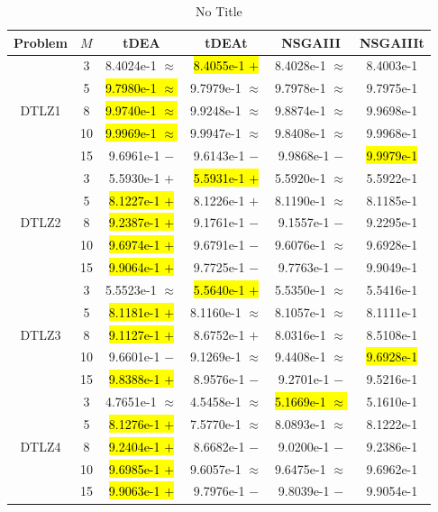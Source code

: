 \documentclass[conference]{IEEEtran}
\begin{document}
\begin{table}[htbp]
  \renewcommand{\arraystretch}{1}
  \centering
  \caption{No Title}
  \begin{tabular}{cccccc}
  \toprule
  Problem&$M$&tDEA&tDEAt&NSGAIII&NSGAIIIt\\
  \midrule
  \multirow{5}{*}{DTLZ1}&3&8.4024e-1 $\approx$&\hl{8.4055e-1 $+$}&8.4028e-1 $\approx$&8.4003e-1\\
  &5&\hl{9.7980e-1 $\approx$}&9.7979e-1 $\approx$&9.7978e-1 $\approx$&9.7975e-1\\
  &8&\hl{9.9740e-1 $\approx$}&9.9248e-1 $\approx$&9.8874e-1 $\approx$&9.9698e-1\\
  &10&\hl{9.9969e-1 $\approx$}&9.9947e-1 $\approx$&9.8408e-1 $\approx$&9.9968e-1\\
  &15&9.6961e-1 $-$&9.6143e-1 $-$&9.9868e-1 $-$&\hl{9.9979e-1}\\
  \hline
  \multirow{5}{*}{DTLZ2}&3&5.5930e-1 $+$&\hl{5.5931e-1 $+$}&5.5920e-1 $\approx$&5.5922e-1\\
  &5&\hl{8.1227e-1 $+$}&8.1226e-1 $+$&8.1190e-1 $\approx$&8.1185e-1\\
  &8&\hl{9.2387e-1 $+$}&9.1761e-1 $-$&9.1557e-1 $-$&9.2295e-1\\
  &10&\hl{9.6974e-1 $+$}&9.6791e-1 $-$&9.6076e-1 $\approx$&9.6928e-1\\
  &15&\hl{9.9064e-1 $+$}&9.7725e-1 $-$&9.7763e-1 $-$&9.9049e-1\\
  \hline
  \multirow{5}{*}{DTLZ3}&3&5.5523e-1 $\approx$&\hl{5.5640e-1 $+$}&5.5350e-1 $\approx$&5.5416e-1\\
  &5&\hl{8.1181e-1 $+$}&8.1160e-1 $\approx$&8.1057e-1 $\approx$&8.1111e-1\\
  &8&\hl{9.1127e-1 $+$}&8.6752e-1 $+$&8.0316e-1 $\approx$&8.5108e-1\\
  &10&9.6601e-1 $-$&9.1269e-1 $\approx$&9.4408e-1 $\approx$&\hl{9.6928e-1}\\
  &15&\hl{9.8388e-1 $+$}&8.9576e-1 $-$&9.2701e-1 $-$&9.5216e-1\\
  \hline
  \multirow{5}{*}{DTLZ4}&3&4.7651e-1 $\approx$&4.5458e-1 $\approx$&\hl{5.1669e-1 $\approx$}&5.1610e-1\\
  &5&\hl{8.1276e-1 $+$}&7.5770e-1 $\approx$&8.0893e-1 $\approx$&8.1222e-1\\
  &8&\hl{9.2404e-1 $+$}&8.6682e-1 $-$&9.0200e-1 $-$&9.2386e-1\\
  &10&\hl{9.6985e-1 $+$}&9.6057e-1 $\approx$&9.6475e-1 $\approx$&9.6962e-1\\
  &15&\hl{9.9063e-1 $+$}&9.7976e-1 $-$&9.8039e-1 $-$&9.9054e-1\\

\end{tabular}
\end{table}
\end{document}
